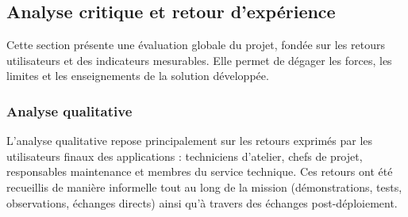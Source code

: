 \documentclass[11pt,a4paper]{article}
\begin{document}
\subsection{Analyse critique et retour d’expérience}

Cette section présente une évaluation globale du projet, fondée sur les retours utilisateurs et des indicateurs mesurables. Elle permet de dégager les forces, les limites et les enseignements de la solution développée.


\subsubsection{Analyse qualitative}

L’analyse qualitative repose principalement sur les retours exprimés par les utilisateurs finaux des applications : techniciens d’atelier, chefs de projet, responsables maintenance et membres du service technique. Ces retours ont été recueillis de manière informelle tout au long de la mission (démonstrations, tests, observations, échanges directs) ainsi qu’à travers des échanges post-déploiement.
\end{document}
